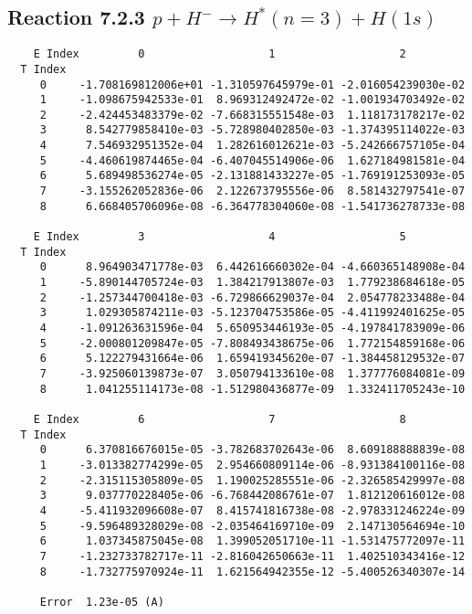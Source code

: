 \documentclass[12pt]{article}
\begin{document}
                               


\newpage
\subsection{
Reaction 7.2.3 $   p + H^- \rightarrow H^*(n=3) + H(1s)$}


\begin{small}\begin{verbatim}
    E Index         0                   1                   2
  T Index
     0     -1.708169812006e+01 -1.310597645979e-01 -2.016054239030e-02
     1     -1.098675942533e-01  8.969312492472e-02 -1.001934703492e-02
     2     -2.424453483379e-02 -7.668315551548e-03  1.118173178217e-02
     3      8.542779858410e-03 -5.728980402850e-03 -1.374395114022e-03
     4      7.546932951352e-04  1.282616012621e-03 -5.242666757105e-04
     5     -4.460619874465e-04 -6.407045514906e-06  1.627184981581e-04
     6      5.689498536274e-05 -2.131881433227e-05 -1.769191253093e-05
     7     -3.155262052836e-06  2.122673795556e-06  8.581432797541e-07
     8      6.668405706096e-08 -6.364778304060e-08 -1.541736278733e-08

    E Index         3                   4                   5
  T Index
     0      8.964903471778e-03  6.442616660302e-04 -4.660365148908e-04
     1     -5.890144705724e-03  1.384217913807e-03  1.779238684618e-05
     2     -1.257344700418e-03 -6.729866629037e-04  2.054778233488e-04
     3      1.029305874211e-03 -5.123704753586e-05 -4.411992401625e-05
     4     -1.091263631596e-04  5.650953446193e-05 -4.197841783909e-06
     5     -2.000801209847e-05 -7.808493438675e-06  1.772154859168e-06
     6      5.122279431664e-06  1.659419345620e-07 -1.384458129532e-07
     7     -3.925060139873e-07  3.050794133610e-08  1.377776084081e-09
     8      1.041255114173e-08 -1.512980436877e-09  1.332411705243e-10

    E Index         6                   7                   8
  T Index
     0      6.370816676015e-05 -3.782683702643e-06  8.609188888839e-08
     1     -3.013382774299e-05  2.954660809114e-06 -8.931384100116e-08
     2     -2.315115305809e-05  1.190025285551e-06 -2.326585429997e-08
     3      9.037770228405e-06 -6.768442086761e-07  1.812120616012e-08
     4     -5.411932096608e-07  8.415741816738e-08 -2.978331246224e-09
     5     -9.596489328029e-08 -2.035464169710e-09  2.147130564694e-10
     6      1.037345875045e-08  1.399052051710e-11 -1.531475772097e-11
     7     -1.232733782717e-11 -2.816042650663e-11  1.402510343416e-12
     8     -1.732775970924e-11  1.621564942355e-12 -5.400526340307e-14

     Error  1.23e-05 (A)
\end{verbatim}\end{small}
\end{document}
